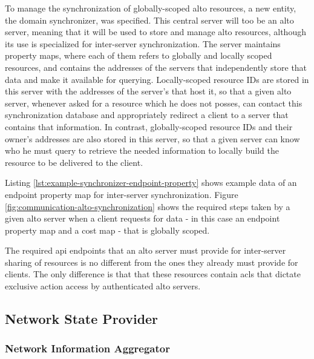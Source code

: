     To manage the synchronization of globally-scoped \gls{alto} resources, a new entity, the domain synchronizer, was specified.
    This central server will too be an \gls{alto} server, meaning that it will be used to store and manage \gls{alto} resources, although its use is specialized for inter-server synchronization.
    The server maintains property maps, where each of them refers to globally and locally scoped resources, and contains the addresses of the servers that independently store that data and make it available for querying.
    Locally-scoped resource IDs are stored in this server with the addresses of the server's that host it, so that a given \gls{alto} server, whenever asked for a resource which he does not posses, can contact this synchronization database and appropriately redirect a client to a server that contains that information.
    In contrast, globally-scoped resource IDs and their owner's addresses are also stored in this server, so that a given server can know who he must query to retrieve the needed information to locally build the resource to be delivered to the client.

    Listing \ref{lst:example-synchronizer-endpoint-property} shows example data of an endpoint property map for inter-server synchronization.
    Figure \ref{fig:communication-alto-synchronization} shows the required steps taken by a given \gls{alto} server when a client requests for data - in this case an endpoint property map and a cost map - that is globally scoped.

    The required \gls{api} endpoints that an \gls{alto} server must provide for inter-server sharing of resources is no different from the ones they already must provide for clients.
    The only difference is that that these resources contain \glspl{acl} that dictate exclusive action access by authenticated \gls{alto} servers.

\subsection{Network State Provider}

\subsubsection{Network Information Aggregator}

